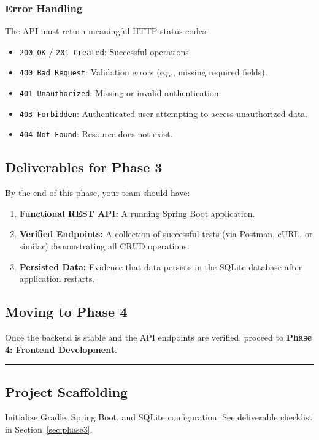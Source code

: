 \subsubsection{Error Handling}
The API must return meaningful HTTP status codes:
\begin{itemize}
  \item \texttt{200 OK} / \texttt{201 Created}: Successful operations.
  \item \texttt{400 Bad Request}: Validation errors (e.g., missing required fields).
  \item \texttt{401 Unauthorized}: Missing or invalid authentication.
  \item \texttt{403 Forbidden}: Authenticated user attempting to access unauthorized data.
  \item \texttt{404 Not Found}: Resource does not exist.
\end{itemize}

\subsection{Deliverables for Phase 3}
By the end of this phase, your team should have:
\begin{enumerate}
  \item \textbf{Functional REST API:} A running Spring Boot application.
  \item \textbf{Verified Endpoints:} A collection of successful tests (via Postman, cURL, or similar) demonstrating all CRUD operations.
  \item \textbf{Persisted Data:} Evidence that data persists in the SQLite database after application restarts.
\end{enumerate}

\subsection{Moving to Phase 4}
Once the backend is stable and the API endpoints are verified,
proceed to \textbf{Phase 4: Frontend Development}.


\medskip
\noindent\rule{\linewidth}{0.4pt}
\medskip


\subsection{Project Scaffolding}\label{sec:be-scaffolding}
Initialize Gradle, Spring Boot, and SQLite configuration.
See deliverable checklist in Section~\ref{sec:phase3}.

